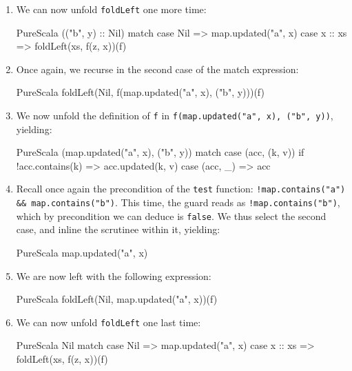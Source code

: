 \documentclass[a4paper,twoside]{article}
\newcommand{\InlineS}[1]{\lstinline[language=PureScala,basicstyle=\small\ttfamily,columns=fixed]|#1|}
\newcommand{\stt}[1]{\texttt{\small{#1}}}
\begin{document}
\begin{enumerate}
\item We can now unfold \stt{foldLeft} one more time:

\begin{ShortCode}{PureScala}
(("b", y) :: Nil) match {
  case Nil     => map.updated("a", x)
  case x :: xs => foldLeft(xs, f(z, x))(f)
}
\end{ShortCode}

\item Once again, we recurse in the second case of the match expression:

\begin{ShortCode}{PureScala}
foldLeft(Nil, f(map.updated("a", x), ("b", y)))(f)
\end{ShortCode}

\item We now unfold the definition of \stt{f} in \InlineS{f(map.updated("a", x), ("b", y))}, yielding:

\begin{ShortCode}{PureScala}
(map.updated("a", x), ("b", y)) match {
  case (acc, (k, v)) if !acc.contains(k) => acc.updated(k, v)
  case (acc, _)                          => acc
}
\end{ShortCode}

\item Recall once again the precondition of the \stt{test} function: \InlineS{!map.contains("a") && map.contains("b")}. This time, the guard reads as \InlineS{!map.contains("b")}, which by precondition we can deduce is \InlineS{false}. We thus select the second case, and inline the scrutinee within it, yielding:

\begin{ShortCode}{PureScala}
map.updated("a", x)
\end{ShortCode}

\clearpage

\item We are now left with the following expression:

\begin{ShortCode}{PureScala}
foldLeft(Nil, map.updated("a", x))(f)
\end{ShortCode}

\item We can now unfold \stt{foldLeft} one last time:

\begin{ShortCode}{PureScala}
Nil match {
  case Nil     => map.updated("a", x)
  case x :: xs => foldLeft(xs, f(z, x))(f)
}
\end{ShortCode}


\end{enumerate}
\end{document}
